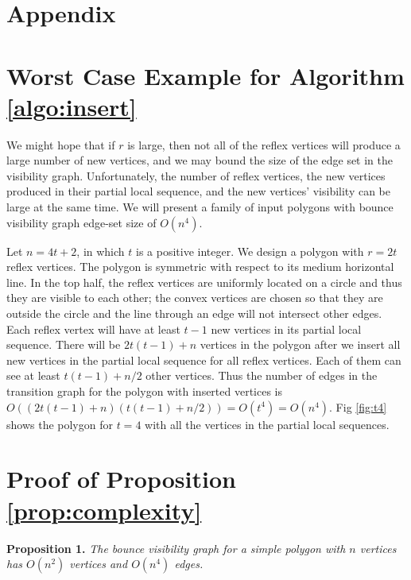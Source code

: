 \documentclass[]{styles/svproc}  %
\begin{document}



\newpage
\section{Appendix}

\begin{appendix}

\section{Worst Case Example for Algorithm \ref{algo:insert}}

We might hope that if $r$ is large, then not all of the reflex vertices will
produce a large number of new vertices, and we may bound the size of the edge
set in the visibility graph. Unfortunately, the number of reflex
vertices, the new vertices produced in their partial local sequence, and the new
vertices' visibility can be large at the same time. We will present a family of
input polygons with bounce visibility graph edge-set size of $O(n^4)$.

Let $n = 4t+2$, in which $t$ is a positive integer. We design a polygon with
$r = 2t$ reflex vertices. The polygon is symmetric with respect to its medium
horizontal line. In the top half, the reflex vertices are uniformly located on a
circle and thus they are visible to each other; the convex vertices are chosen
so that they are outside the circle and the line through an edge will not
intersect other edges. Each reflex vertex will have at least $t-1$ new
vertices in its partial local sequence. There will be $2t(t-1)+n$
vertices in the polygon after we insert all new vertices in the partial local
sequence for all reflex vertices. Each of them can see at least $t(t-1)+n/2$
other vertices. Thus the number of edges in the transition graph for the
polygon with inserted vertices is
$O ((2t(t-1)+n)(t(t-1)+n/2)) = O(t^4) = O(n^4)$.
Fig \ref{fig:t4} shows the polygon for $t = 4$ with all the
vertices in the partial local sequences. %

\section{Proof of Proposition \ref{prop:complexity}}


\textbf{Proposition 1.} {\em The bounce visibility graph for a simple polygon with $n$ vertices has 
$O(n^2)$ vertices and $O(n^4)$ edges.}


\end{appendix}
\end{document}
